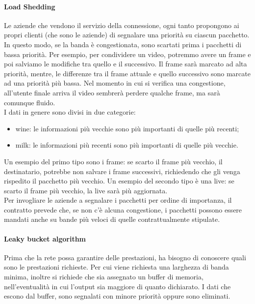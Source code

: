 \documentclass{article}
\begin{document}
\paragraph{Load Shedding}
Le aziende che vendono il servizio della connessione, ogni tanto propongono ai
propri clienti (che sono le aziende) di segnalare una priorità su ciascun
pacchetto. In questo modo, se la banda è congestionata, sono scartati prima i
pacchetti di bassa priorità. Per esempio, per condividere un video, potremmo
avere un frame e poi salviamo le modifiche tra quello e il successivo. Il frame
sarà marcato ad alta priorità, mentre, le differenze tra il frame attuale e
quello successivo sono marcate ad una priorità più bassa. Nel momento in cui si
verifica una congestione, all'utente finale arriva il video sembrerà perdere
qualche frame, ma sarà comunque fluido.\\
I dati in genere sono divisi in due categorie:
\begin{itemize}
	\item wine: le informazioni più vecchie sono più importanti di quelle più
		recenti;

	\item milk: le informazioni più recenti sono più importanti di quelle più
		vecchie.
\end{itemize}
Un esempio del primo tipo sono i frame: se scarto il frame più vecchio, il
destinatario, potrebbe non salvare i frame successivi, richiedendo che gli venga
rispedito il pacchetto più vecchio. Un esempio del secondo tipo è una live:
se scarto il frame più vecchio, la live sarà più aggiornata.\\
Per invogliare le aziende a segnalare i pacchetti per ordine di importanza, il
contratto prevede che, se non c'è alcuna congestione, i pacchetti possono essere
mandati anche su bande più veloci di quelle contrattualmente stipulate.\\

\paragraph{Leaky bucket algorithm}
Prima che la rete possa garantire delle prestazioni, ha bisogno di conoscere
quali sono le prestazioni richieste. Per cui viene richiesta una larghezza di
banda minima, inoltre si richiede che sia assegnato un buffer di memoria,
nell'eventualità in cui l'output sia maggiore di quanto dichiarato. I dati che
escono dal buffer, sono segnalati con minore priorità oppure sono eliminati.\\
\end{document}
